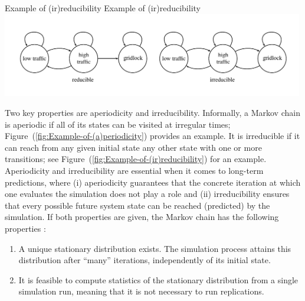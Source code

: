 \createfigure%
{Example of (ir)reducibility}%
{Example of (ir)reducibility}%
{\label{fig:Example-of-(ir)reducibility}}%
{\includegraphics[width=0.99\textwidth, angle=0]{understanding/figures/mc/fig2.pdf}}%
{}

Two key properties are aperiodicity and irreducibility. Informally,
a Markov chain is aperiodic if all of its states can be visited at
irregular times; Figure~(\ref{fig:Example-of-(a)periodicity}) provides
an example. It is irreducible if it can reach from any given initial
state any other state with one or more transitions; see Figure~(\ref{fig:Example-of-(ir)reducibility})
for an example. Aperiodicity and irreducibility are essential when
it comes to long-term predictions, where (i) aperiodicity guarantees
that the concrete iteration at which one evaluates the simulation
does not play a role and (ii) irreducibility ensures that every possible
future system state can be reached (predicted) by the simulation.
If both properties are given, the Markov chain has the following properties
\citep{ross-2006}:
\begin{enumerate}
\item A unique stationary distribution exists. The simulation process attains
this distribution after {}``many'' iterations, independently of
its initial state.
\item It is feasible to compute statistics of the stationary distribution
from a single simulation run, meaning that it is not necessary to
run replications.
\label{it:self-averaging}
\end{enumerate}

